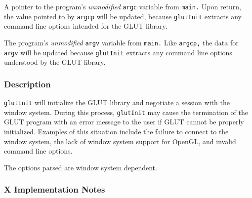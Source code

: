\begin{description}
\itemsep 0in
\item[\tt argcp] A pointer to the program's
{\em unmodified} {\tt argc} variable from {\tt main.}
Upon return, the value pointed to by {\tt argcp}
will be updated, because {\tt glutInit}
extracts any command line options intended for the GLUT library.

\item[\tt argv] The program's {\em unmodified} {\tt argv} variable from
{\tt main.} Like {\tt argcp,} the data for {\tt argv}
will be updated because {\tt glutInit}
extracts any command line options understood by the GLUT library.
\end{description}

\subsubsection*{Description}

{\tt glutInit} will initialize the GLUT library and negotiate a session with the window
system.  During this process, {\tt glutInit}
may cause the termination of the GLUT program with an error message to the user if GLUT
cannot be properly initialized.  Examples of this situation include the failure to
connect to the window system, the lack of window system support for OpenGL, and invalid
command line options.

The options parsed are window system dependent.

\subsubsection*{X Implementation Notes}

